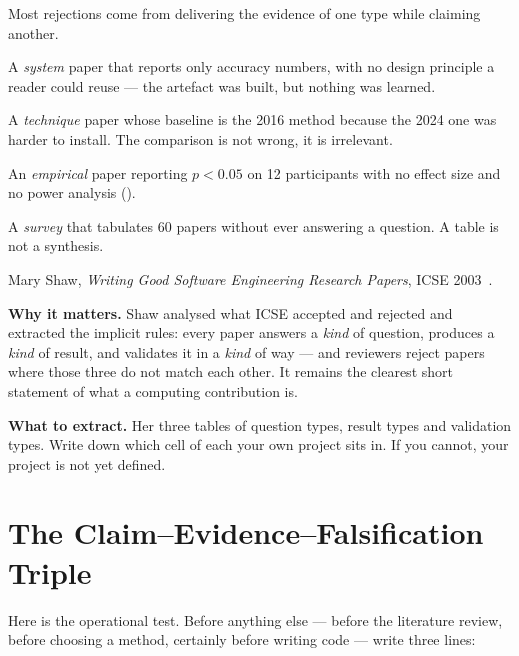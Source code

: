 \begin{pitfall}
Most rejections come from delivering the evidence of one type while claiming
another.

\begin{tight}
  \item A \emph{system} paper that reports only accuracy numbers, with no
    design principle a reader could reuse --- the artefact was built, but
    nothing was learned.
  \item A \emph{technique} paper whose baseline is the 2016 method because the
    2024 one was harder to install. The comparison is not wrong, it is
    irrelevant.
  \item An \emph{empirical} paper reporting $p < 0.05$ on 12 participants with
    no effect size and no power analysis ().
  \item A \emph{survey} that tabulates 60 papers without ever answering a
    question. A table is not a synthesis.
\end{tight}
\end{pitfall}

\begin{paperbox}
Mary Shaw, \emph{Writing Good Software Engineering Research
Papers}, ICSE 2003~\cite{shaw2003writing}.

\medskip
\textbf{Why it matters.} Shaw analysed what ICSE accepted and rejected and
extracted the implicit rules: every paper answers a \emph{kind} of question,
produces a \emph{kind} of result, and validates it in a \emph{kind} of way ---
and reviewers reject papers where those three do not match each other. It
remains the clearest short statement of what a computing contribution is.

\medskip
\textbf{What to extract.} Her three tables of question types, result types and
validation types. Write down which cell of each your own project sits in. If
you cannot, your project is not yet defined.
\end{paperbox}

\section{The Claim--Evidence--Falsification Triple}

Here is the operational test. Before anything else --- before the literature
review, before choosing a method, certainly before writing code --- write three
lines:

